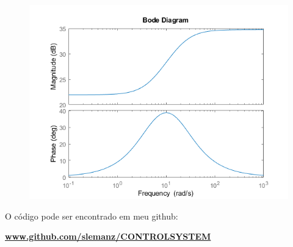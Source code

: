\documentclass{layout}
\begin{document}
\begin{figure}[H]
    \centering 
 	\includegraphics[width=\textwidth]{images/figure6.png}
\end{figure}

\noindent O código pode ser encontrado em meu github:

\href{https://github.com/slemanz/CONTROL_SYSTEM/blob/main/MATLAB/LEAD_COMPENSATOR/Compensador_por_avanco.m}{\bfseries \color{BlueViolet} www.github.com/slemanz/CONTROL\textunderscore SYSTEM}
\end{document}
